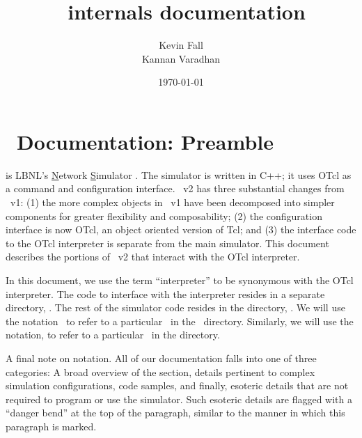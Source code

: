 \documentclass{article}
\begin{document}
\title{\nsTcl\ internals documentation}
\author{%
  Kevin Fall \\
  Kannan Varadhan }
\date{\today}


\section{\ns\ Documentation: Preamble}
\label{sec:nsDocumentation}

is LBNL's \underline{N}etwork \underline{S}imulator \cite{ns}.
The simulator is written in C++;
it uses OTcl as a command and configuration interface.
\ns~v2 has three substantial changes from \ns~v1:
(1) the more complex objects in \ns~v1
    have been decomposed into simpler components
    for greater flexibility and composability;
(2) the configuration interface is now OTcl, 
    an object oriented version of Tcl; and
(3) the interface code to the OTcl interpreter is
    separate from the main simulator.
This document describes the portions of \ns~v2
that interact with the OTcl interpreter.

In this document,
we use the term ``interpreter''
to be synonymous with the OTcl interpreter.
The code to interface with the interpreter resides
in a separate directory, .
The rest of the simulator code resides in the directory, .
We will use the notation \
to refer to a particular \ in the
\ directory.
Similarly, we will use the notation, 
to refer to a particular \tup{file}\ in the  directory.

\danger
A final note on notation.
All of our documentation falls into one of three categories:
A broad overview of the section,
details pertinent to complex simulation configurations,
code samples,
and finally,
esoteric details that are not required to program or use the simulator.
Such esoteric details are flagged with a ``danger bend'' at the top of
the paragraph, similar to the manner in which this paragraph is marked.
\end{document}
